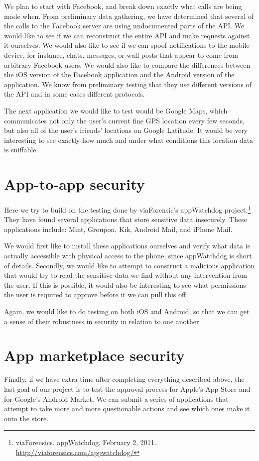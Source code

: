 \documentclass[11pt]{article}
\begin{document}
We plan to start with Facebook, and break down exactly what calls are being
made when. From preliminary data gathering, we have determined that several of
the calls to the Facebook server are using undocumented parts of the API. We
would like to see if we can reconstruct the entire API and make requests
against it ourselves. We would also like to see if we can spoof notifications
to the mobile device, for instance, chats, messages, or wall posts that appear
to come from arbitrary Facebook users. We would also like to compare the
differences between the iOS version of the Facebook application and the Android
version of the application. We know from preliminary testing that they use
different versions of the API and in some cases different protocols.

The next application we would like to test would be Google Maps, which
communicates not only the user's current fine GPS location every few seconds,
but also all of the user's friends' locations on Google Latitude. It would be
very interesting to see exactly how much and under what conditions this
location data is sniffable.

\section{App-to-app security}
Here we try to build on the testing done by viaForensic's appWatchdog
project.\footnote{viaForensics. appWatchdog, February 2, 2011.
\url{http://viaforensics.com/appwatchdog/}} They have found several
applications that store sensitive data insecurely. These applications include:
Mint, Groupon, Kik, Android Mail, and iPhone Mail.

We would first like to install these applications ourselves and verify what
data is actually accessible with physical access to the phone, since
appWatchdog is short of details. Secondly, we would like to attempt to
construct a malicious application that would try to read the sensitive data we
find without any intervention from the user. If this is possible, it would also
be interesting to see what permissions the user is required to approve before
it we can pull this off.

Again, we would like to do testing on both iOS and Android, so that we can get
a sense of their robustness in security in relation to one another.

\section{App marketplace security}
Finally, if we have extra time after completing everything described above, the
last goal of our project is to test the approval process for Apple's App Store
and for Google's Android Market. We can submit a series of applications that
attempt to take more and more questionable actions and see which ones make it
onto the store.
\end{document}
